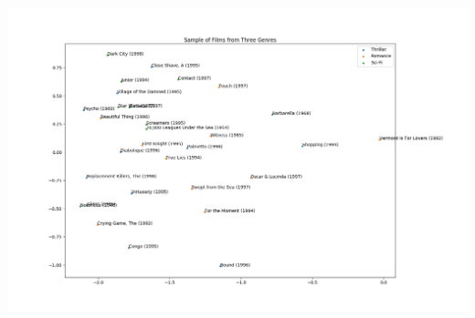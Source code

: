 \documentclass[titlepage]{article}
\begin{document}
\begin{center}
    \includegraphics[width=\textwidth]{mat_fac_4.png} \\
\end{center}
\end{document}
